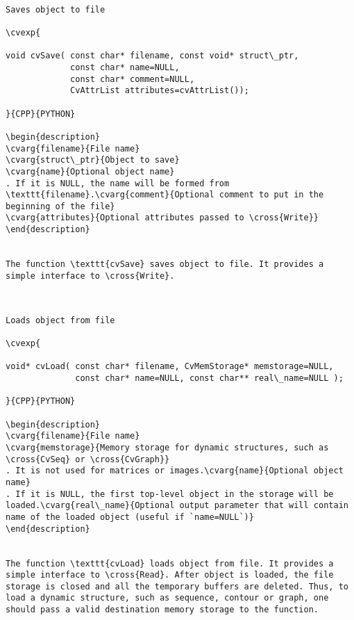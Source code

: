 \begin{verbatim}

Saves object to file

\cvexp{

void cvSave( const char* filename, const void* struct\_ptr,
             const char* name=NULL,
             const char* comment=NULL,
             CvAttrList attributes=cvAttrList());

}{CPP}{PYTHON}

\begin{description}
\cvarg{filename}{File name}
\cvarg{struct\_ptr}{Object to save}
\cvarg{name}{Optional object name}
. If it is NULL, the name will be formed from \texttt{filename}.\cvarg{comment}{Optional comment to put in the beginning of the file}
\cvarg{attributes}{Optional attributes passed to \cross{Write}}
\end{description}


The function \texttt{cvSave} saves object to file. It provides a simple interface to \cross{Write}.


\end{verbatim}
\begin{verbatim}

Loads object from file

\cvexp{

void* cvLoad( const char* filename, CvMemStorage* memstorage=NULL,
              const char* name=NULL, const char** real\_name=NULL );

}{CPP}{PYTHON}

\begin{description}
\cvarg{filename}{File name}
\cvarg{memstorage}{Memory storage for dynamic structures, such as \cross{CvSeq} or \cross{CvGraph}}
. It is not used for matrices or images.\cvarg{name}{Optional object name}
. If it is NULL, the first top-level object in the storage will be loaded.\cvarg{real\_name}{Optional output parameter that will contain name of the loaded object (useful if `name=NULL`)}
\end{description}


The function \texttt{cvLoad} loads object from file. It provides a simple interface to \cross{Read}. After object is loaded, the file storage is closed and all the temporary buffers are deleted. Thus, to load a dynamic structure, such as sequence, contour or graph, one should pass a valid destination memory storage to the function.


\end{verbatim}
